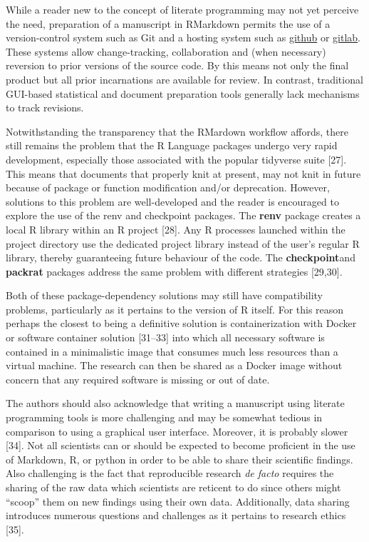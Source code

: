 \documentclass[]{elsarticle} %
\begin{document}
While a reader new to the concept of literate programming may not yet
perceive the need, preparation of a manuscript in RMarkdown permits the
use of a version-control system such as Git and a hosting system such as
\href{https://github.com/}{github} or
\href{https://gitlab.com/}{gitlab}. These systems allow change-tracking,
collaboration and (when necessary) reversion to prior versions of the
source code. By this means not only the final product but all prior
incarnations are available for review. In contrast, traditional
GUI-based statistical and document preparation tools generally lack
mechanisms to track revisions.

Notwithstanding the transparency that the RMardown workflow affords,
there still remains the problem that the R Language packages undergo
very rapid development, especially those associated with the popular
tidyverse suite {[}27{]}. This means that documents that properly knit
at present, may not knit in future because of package or function
modification and/or deprecation. However, solutions to this problem are
well-developed and the reader is encouraged to explore the use of the
renv and checkpoint packages. The \textbf{renv} package creates a local
R library within an R project {[}28{]}. Any R processes launched within
the project directory use the dedicated project library instead of the
user's regular R library, thereby guaranteeing future behaviour of the
code. The \textbf{checkpoint}and \textbf{packrat} packages address the
same problem with different strategies {[}29,30{]}.

Both of these package-dependency solutions may still have compatibility
problems, particularly as it pertains to the version of R itself. For
this reason perhaps the closest to being a definitive solution is
containerization with Docker or software container solution {[}31--33{]}
into which all necessary software is contained in a minimalistic image
that consumes much less resources than a virtual machine. The research
can then be shared as a Docker image without concern that any required
software is missing or out of date.

The authors should also acknowledge that writing a manuscript using
literate programming tools is more challenging and may be somewhat
tedious in comparison to using a graphical user interface. Moreover, it
is probably slower {[}34{]}. Not all scientists can or should be
expected to become proficient in the use of Markdown, R, or python in
order to be able to share their scientific findings. Also challenging is
the fact that reproducible research \emph{de facto} requires the sharing
of the raw data which scientists are reticent to do since others might
``scoop'' them on new findings using their own data. Additionally, data
sharing introduces numerous questions and challenges as it pertains to
research ethics {[}35{]}.
\end{document}
